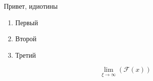 \documentclass[a4paper,12pt]{article}
\begin{document}
Привет, идиотины
\begin{enumerate}
    \item Первый
    \item Второй
    \item Третий
\end{enumerate}
\[\lim_{\xi \to \infty}(\mathcal{F}(x))\]
\end{document}
